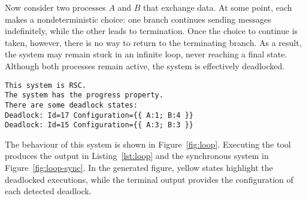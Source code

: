 \begin{example}\label{exm:loop}
Now consider two processes $A$ and $B$ that exchange data. At some
point, each makes a nondeterministic choice: one branch continues
sending messages indefinitely, while the other leads to termination.
Once the choice to continue is taken, however, there is no way to
return to the terminating branch. As a result, the system may remain
stuck in an infinite loop, never reaching a final state. Although both
processes remain active, the system is effectively deadlocked.

\bigskip

\begin{lstlisting}[language={},caption={Output of Example~\ref{exm:loop}.},
    label={lst:loop}]
This system is RSC.
The system has the progress property.
There are some deadlock states:
Deadlock: Id=17 Configuration={{ A:1; B:4 }}
Deadlock: Id=15 Configuration={{ A:3; B:3 }}
\end{lstlisting}

The behaviour of this system is shown in Figure~\ref{fig:loop}. 
Executing the tool produces the output in
Listing~\ref{lst:loop} and the synchronous system in
Figure~\ref{fig:loop-sync}. In the
generated figure, yellow states highlight the deadlocked executions,
while the terminal output provides the configuration of each detected
deadlock.



\end{example}
